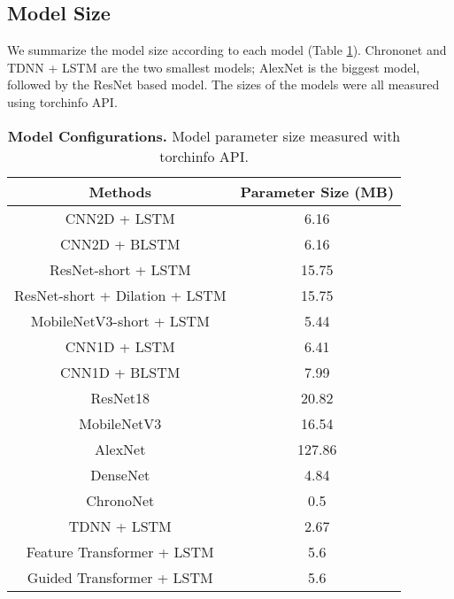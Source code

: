 \documentclass[pmlr,twocolumn,10pt]{jmlr}
\begin{document}
\subsection{Model Size}
\label{sec: size}
We summarize the model size according to each model (Table \ref{modelsize}). Chrononet and TDNN + LSTM are the two smallest models; AlexNet is the biggest model, followed by the ResNet based model. The sizes of the models were all measured using torchinfo API.
\begin{table}[ht!]
	\footnotesize
	\centering
	\caption{\textbf{Model Configurations. } Model parameter size measured with torchinfo API.}
	\label{modelsize}
	\begin{tabular}{c|c}
		\toprule
		Methods  & Parameter Size (MB) \\
		\midrule
		CNN2D + LSTM &	6.16   \\
		CNN2D + BLSTM & 6.16 \\
		ResNet-short + LSTM & 15.75  \\
		ResNet-short + Dilation + LSTM & 15.75  \\
		MobileNetV3-short + LSTM & 5.44   \\
		\midrule
		CNN1D + LSTM & 6.41   \\
		CNN1D + BLSTM & 7.99  \\
		\midrule
		ResNet18  	&20.82 \\
		MobileNetV3 & 	16.54   \\
		AlexNet	& 127.86  \\
		DenseNet &	4.84   \\
		ChronoNet & 0.5 \\
		TDNN + LSTM & 2.67 \\
		\midrule
		Feature Transformer + LSTM & 5.6\\
		Guided Transformer + LSTM &  5.6\\
		\bottomrule
	\end{tabular}
\end{table}

%
 
\end{document}

